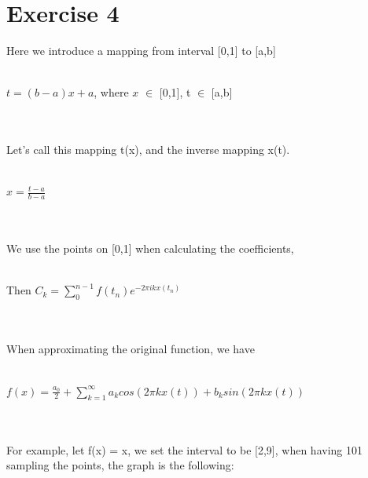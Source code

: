 \documentclass[11pt]{article} %
\begin{document}
\section{Exercise 4}
Here we introduce a mapping from interval [0,1] to [a,b]\\\\
\centerline{$t = (b-a)x+a$, where $x$ $\in$ [0,1], t $\in$ [a,b]}\\\\
Let's call this mapping t(x), and the inverse mapping x(t). \\\\
\centerline{$x = \frac{t-a}{b-a}$}\\\\
We use the points on [0,1] when calculating the coefficients,\\\\ 
\centerline{Then $C_{k} = \sum_{0}^{n-1}f(t_{n})e^{-2\pi i k x(t_{n})}$}\\\\
When approximating the original function, we have\\\\
\centerline{$f(x) = \frac{a_{0}}{2}+\sum_{k=1}^{\infty}a_{k}cos(2\pi k x(t))+b_{k}sin(2\pi k x(t))$}\\\\
For example, let f(x) = x, we set the interval to be [2,9], when having 101 sampling the points, the graph is the following:\\\\
\end{document}
